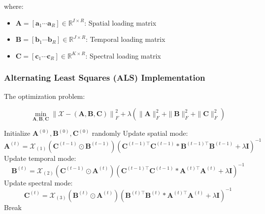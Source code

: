 \documentclass[11pt]{article}
\newcommand\0{\mathbf{0}}
\newcommand\<{\langle}
\renewcommand\>{\rangle}
\begin{document}
    where:
    \begin{itemize}
        \item \(\mathbf{A} = [\mathbf{a}_1 \cdots \mathbf{a}_R] \in \mathbb{R}^{I \times R}\): Spatial loading matrix
        \item \(\mathbf{B} = [\mathbf{b}_1 \cdots \mathbf{b}_R] \in \mathbb{R}^{J \times R}\): Temporal loading matrix
        \item \(\mathbf{C} = [\mathbf{c}_1 \cdots \mathbf{c}_R] \in \mathbb{R}^{K \times R}\): Spectral loading matrix
    \end{itemize}
    
    \subsubsection{Alternating Least Squares (ALS) Implementation}
    The optimization problem:
    
    \begin{equation}
    \min_{\mathbf{A},\mathbf{B},\mathbf{C}} \left\lVert \mathcal{X} - \left( \mathbf{A},\mathbf{B},\mathbf{C} \right) \right\rVert_F^2 + \lambda(\|\mathbf{A}\|_F^2 + \|\mathbf{B}\|_F^2 + \|\mathbf{C}\|_F^2)
    \end{equation}
    
    \begin{algorithm}[H]
    \caption{CPD-ALS for EEG/MEG}
    \begin{algorithmic}[1]
    \State Initialize \(\mathbf{A}^{(0)}, \mathbf{B}^{(0)}, \mathbf{C}^{(0)}\) randomly
        \State Update spatial mode:
        \[
        \mathbf{A}^{(t)} = \mathcal{X}_{(1)}(\mathbf{C}^{(t-1)} \odot \mathbf{B}^{(t-1)})(\mathbf{C}^{(t-1)\top}\mathbf{C}^{(t-1)} \ast \mathbf{B}^{(t-1)\top}\mathbf{B}^{(t-1)} + \lambda\mathbf{I})^{-1}
        \]
        \State Update temporal mode:
        \[
        \mathbf{B}^{(t)} = \mathcal{X}_{(2)}(\mathbf{C}^{(t-1)} \odot \mathbf{A}^{(t)})(\mathbf{C}^{(t-1)\top}\mathbf{C}^{(t-1)} \ast \mathbf{A}^{(t)\top}\mathbf{A}^{(t)} + \lambda\mathbf{I})^{-1}
        \]
        \State Update spectral mode:
        \[
        \mathbf{C}^{(t)} = \mathcal{X}_{(3)}(\mathbf{B}^{(t)} \odot \mathbf{A}^{(t)})(\mathbf{B}^{(t)\top}\mathbf{B}^{(t)} \ast \mathbf{A}^{(t)\top}\mathbf{A}^{(t)} + \lambda\mathbf{I})^{-1}
        \]
            \State Break
        \EndIf
    \EndFor
    \end{algorithmic}
    \end{algorithm}
    
\end{document}
